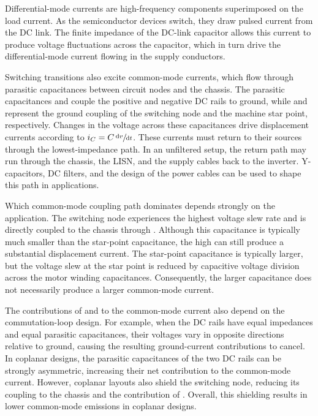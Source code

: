Differential-mode currents are high-frequency components superimposed on the load current.
As the semiconductor devices switch, they draw pulsed current from the DC link.
The finite impedance of the DC-link capacitor allows this current to produce voltage fluctuations across the capacitor, which in turn drive the differential-mode current flowing in the supply conductors.

Switching transitions also excite common-mode currents, which flow through parasitic capacitances between circuit nodes and the chassis.
The parasitic capacitances  and  couple the positive and negative DC rails to ground, while  and  represent the ground coupling of the switching node and the machine star point, respectively.
Changes in the voltage across these capacitances drive displacement currents according to $i_C = C\,\sfrac{\textnormal{d}v}{\textnormal{d}t}$.
These currents must return to their sources through the lowest-impedance path.
In an unfiltered setup, the return path may run through the chassis, the LISN, and the supply cables back to the inverter.
Y-capacitors, DC filters, and the design of the power cables can be used to shape this path in applications.

Which common-mode coupling path dominates depends strongly on the application.
The switching node experiences the highest voltage slew rate and is directly coupled to the chassis through .
Although this capacitance is typically much smaller than the star-point capacitance, the high  can still produce a substantial displacement current.
The star-point capacitance is typically larger, but the voltage slew at the star point is reduced by capacitive voltage division across the motor winding capacitances.
Consequently, the larger capacitance does not necessarily produce a larger common-mode current.

The contributions of  and  to the common-mode current also depend on the commutation-loop design.
For example, when the DC rails have equal impedances and equal parasitic capacitances, their voltages vary in opposite directions relative to ground, causing the resulting ground-current contributions to cancel.
In coplanar designs, the parasitic capacitances of the two DC rails can be strongly asymmetric, increasing their net contribution to the common-mode current.
However, coplanar layouts also shield the switching node, reducing its coupling to the chassis and the contribution of .
Overall, this shielding results in lower common-mode emissions in coplanar designs.

